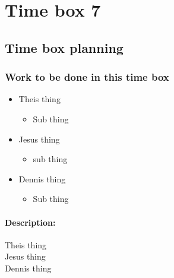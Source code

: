 \section{Time box 7}
\listoftodos
\subsection{Time box planning}

\begin{figure}[H]
	\begin{centering}
	\end{centering}
\end{figure}

\subsubsection{Work to be done in this time box}
\begin{itemize}
	\item Theis thing
	\begin{itemize}
		\item Sub thing
	\end{itemize}
	\item Jesus thing
		\begin{itemize}
			\item sub thing
		\end{itemize}
	\item Dennis thing
	\begin{itemize}
		\item Sub thing
	\end{itemize}
\end{itemize}

\paragraph{Description:}
\begin{description}
	\item[Theis thing]
	\item[Jesus thing]
	\item[Dennis thing]
\end{description}

